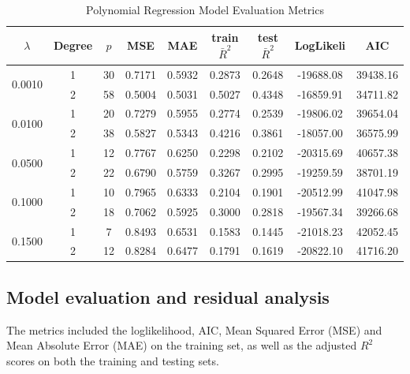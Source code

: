 \documentclass[12pt]{article}
\begin{document}
\begin{table}[!h]
    \centering
    \caption{Polynomial Regression Model Evaluation Metrics}
    \label{tab:metrics}
    \begin{tabular}{ccccccccc}
    \toprule
    \textbf{$\lambda$} & \textbf{Degree} & \textbf{$p$} & \textbf{MSE} & \textbf{MAE} & \textbf{train $\bar R^2$} & \textbf{test $\bar R^2$} & \textbf{LogLikeli} & \textbf{AIC} \\
    \midrule
    \multirow{2}{*}{0.0010} & 1 & 30 & 0.7171 & 0.5932 & 0.2873 & 0.2648 & -19688.08 & 39438.16 \\
                            & 2 & 58 & 0.5004 & 0.5031 & 0.5027 & 0.4348 & -16859.91 & 34711.82 \\
                            \hline
    \multirow{2}{*}{0.0100} & 1 & 20 & 0.7279 & 0.5955 & 0.2774 & 0.2539 & -19806.02 & 39654.04 \\
                            & 2 & 38 & 0.5827 & 0.5343 & 0.4216 & 0.3861 & -18057.00 & 36575.99 \\
                            \hline
    \multirow{2}{*}{0.0500} & 1 & 12 & 0.7767 & 0.6250 & 0.2298 & 0.2102 & -20315.69 & 40657.38 \\
                            & 2 & 22 & 0.6790 & 0.5759 & 0.3267 & 0.2995 & -19259.59 & 38701.19 \\
                            \hline
    \multirow{2}{*}{0.1000} & 1 & 10 & 0.7965 & 0.6333 & 0.2104 & 0.1901 & -20512.99 & 41047.98 \\
                            & 2 & 18 & 0.7062 & 0.5925 & 0.3000 & 0.2818 & -19567.34 & 39266.68 \\
                            \hline
    \multirow{2}{*}{0.1500} & 1 & 7 & 0.8493 & 0.6531 & 0.1583 & 0.1445 & -21018.23 & 42052.45 \\
                            & 2 & 12 & 0.8284 & 0.6477 & 0.1791 & 0.1619 & -20822.10 & 41716.20 \\   
    \bottomrule
    \end{tabular}
\end{table}

\subsection{Model evaluation and residual analysis}
The metrics included the loglikelihood, AIC, Mean Squared Error (MSE) and Mean Absolute Error (MAE) on the training set, 
as well as the adjusted $R^2$ scores on both the training and testing sets.
\end{document}
